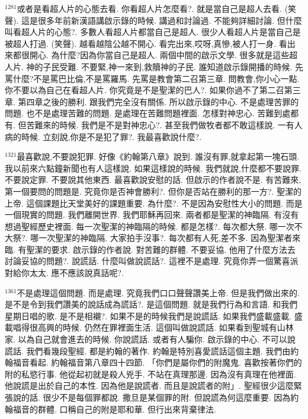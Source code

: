 \documentclass{book}
\begin{document}
$^{1281}$或者是看超人片的心態去看.
你看超人片怎麼看?.
就是當自己是超人去看.
(笑聲).
這是很多年前新漢語講啟示錄的時候.
講過和討論過.
不能夠詳細討論.
但什麼叫看超人片的心態?.
多數人看超人片都當自己是超人.
很少人看超人片是當自己是被超人打過.
(笑聲).
越看越陰公越不開心.
看完出來,哎呀,真慘,被人打一身.
看出來都很開心.
為什麼?因為你當自己是超人.
兩個中間的啟示文學.
很多就是這些超人片.
神的子民受難.
不要緊,神一來到,救贖神的子民.
誰知道啟示錄開播的時候.
先罵什麼?不是罵巴比倫,不是罵羅馬.
先罵是教會第二召第三章.
問教會,你小心一點.
你不要以為自己在看超人片.
你究竟是不是聖潔的巴人?.
如果你過不了第二召第三章.
第四章之後的勝利.
跟我們完全沒有關係.
所以啟示錄的中心.
不是處理苦罪的問題.
也不是處理苦難的問題.
是處理在苦難問題裡面.
怎樣對神忠心.
苦難到處都有.
但苦難來的時候.
我們是不是對神忠心?.
甚至我們做牧者都不敢這樣說.
一有人病的時候.
立刻說,你是不是犯了罪?.
我最喜歡說什麼?.

$^{1321}$最喜歡說,不要說犯罪.
好像《約翰第八章》說到.
誰沒有罪,就拿起第一塊石頭.
我以前來六點鐘新聞也有人這樣說.
如果這樣說的時候.
我們就說,什麼都不要說罪.
不要說定罪.
不要說其他東西.
最喜歡說安慰的話.
但啟示的作者說不是.
有苦難來,第一個要問的問題是.
究竟你是否神會勝利?.
但你是否站在勝利的那一方?.
聖潔的上帝.
這個課題比天堂美好的課題重要.
為什麼?.
不是因為安慰性大小的問題.
而是一個現實的問題.
我們離開世界.
我們耶穌再回來.
兩者都是聖潔的神臨隔.
有沒有想過聖經歷史裡面.
每一次聖潔的神臨隔的時候.
都是怎樣?.
每次都大祭.
哪一次不大祭?.
哪一次聖潔的神臨隔.
大家拍手沒事?.
每次都有人死,差不多.
因為聖潔者來臨.
有聖潔的要求.
啟示錄的作者說.
對苦難的群體.
不要妥協.
他用了什麼方法去討論妥協的問題?.
說謊話.
什麼叫做說謊話?.
這裡不是處理.
究竟你弄一個驚喜派對給你太太.
應不應該說真話呢?.

$^{1361}$不是處理這個問題.
而是處理.
究竟我們口口聲聲讚美上帝.
但是我們做出來的.
是不是令到我們讚美的說話成為謊話?.
是這個問題.
就是我們行為和言語.
和我們星期日唱的歌.
是不是相襯?.
如果不是的時候我們是說謊話.
如果我們盛載盛載.
盛載唱得很高興的時候.
仍然在罪裡面生活.
這個叫做說謊話.
如果看到聖城有山林家.
以為自己就會進去的時候.
你說謊話.
或者有人騙你.
啟示錄的中心.
不可以說謊話.
我們看幾段聖經.
都是約翰的著作.
約翰是特別喜愛謊話這個主題.
我們由約翰福音看起.
約翰福音第八章四十四節.
「你們是屬你們的附魔鬼.
喜歡按著你們的附的私慾行事.
他從起初就是殺人兇手.
不站在真理那邊.
因為沒有真理在他裡面.
他說謊是出於自己的本性.
因為他是說謊者.
而且是說謊者的附」.
聖經很少這麼緊張說的話.
很少不是每個罪都說.
撒旦是某個罪的附.
但說謊為何這麼重要.
因為約翰福音的群體.
口稱自己的附是耶和華.
但行出來背棄律法.
\end{document}
